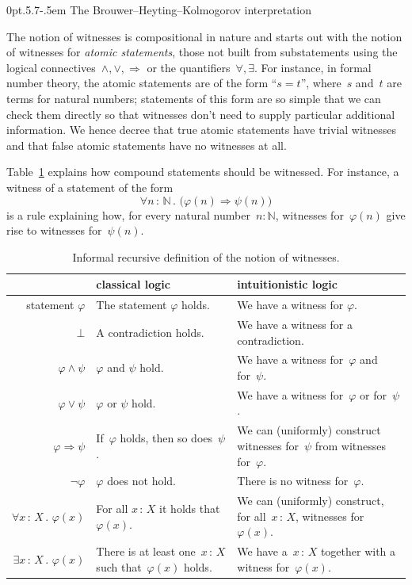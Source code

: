 \documentclass[10pt,reqno,a4paper,openany]{amsbook}
\makeatletter
\theoremstyle{definition}
\theoremstyle{plain}
\theoremstyle{remark}
\newcommand{\NN}{\mathbb{N}}
\newcommand{\?}{\,{:}\,}
\renewcommand{\_}{\mathpunct{.}\,}
\def\subsection{\@startsection{subsection}{2}%
  {0pt}{.5\linespacing\@plus.7\linespacing}{-.5em}%
  {\normalfont\bfseries}}
\makeatother
\begin{document}
\subsection{The Brouwer--Heyting--Kolmogorov interpretation}

The notion of witnesses is compositional in nature and starts out with the notion of witnesses for \emph{atomic
statements}, those not built from substatements using the logical
connectives~$\wedge,\vee,\Rightarrow$ or the quantifiers~$\forall,\exists$. For
instance, in formal number theory, the atomic statements are of the form
``$s = t$'',
where~$s$ and~$t$ are terms for natural numbers; statements of this form are so
simple that we can check them directly so that witnesses don't need to supply
particular additional information. We hence decree that true atomic statements
have trivial witnesses and that false atomic statements have no witnesses at
all.

Table~\ref{table:bhk} explains how compound statements should be witnessed. For
instance, a witness of a statement of the form
\[ \forall n \? \NN\_ \bigl(\varphi(n) \Rightarrow \psi(n)\bigr) \]
is a rule explaining how, for every natural number~$n : \NN$, witnesses
for~$\varphi(n)$ give rise to witnesses for~$\psi(n)$.

\begin{table}
  \centering
  \small
  \renewcommand{\arraystretch}{1.3}
  \begin{tabular}{@{}rp{4.3cm}p{5.3cm}@{}}
    \toprule
    & {classical logic} & {intuitionistic logic}
    \\\midrule
    statement $\varphi$ & The statement $\varphi$ holds. & We have a witness for $\varphi$. \\
    $\bot$ & A contradiction holds. & We have a witness for a contradiction. \\
    $\varphi \wedge \psi$ & $\varphi$ and $\psi$ hold. & We have a witness for~$\varphi$ and for~$\psi$. \\
    $\varphi \vee \psi$ & $\varphi$ or $\psi$ hold. & We have a witness for~$\varphi$ or for~$\psi$. \\
    $\varphi \Rightarrow \psi$ & If~$\varphi$ holds, then so does~$\psi$. &
    We can (uniformly) construct witnesses for~$\psi$ from witnesses
    for~$\varphi$. \\
    $\neg\varphi$ &
      $\varphi$ does not hold. &
      There is no witness for~$\varphi$. \\
    $\forall x\?X\_ \varphi(x)$ & For all $x \? X$ it holds that~$\varphi(x).$ &
      We can (uniformly) construct, for all~$x \? X$, witnesses for~$\varphi(x)$. \\
    $\exists x\?X\_ \varphi(x)$ & \raggedright There is at least one~$x \? X$
    such that~$\varphi(x)$ holds. & {\raggedright
      We have a~$x \? X$ together with a witness for~$\varphi(x)$.} \\
    \bottomrule
  \end{tabular}
  \caption{\label{table:bhk}Informal recursive definition of the notion of witnesses.}
\end{table}
\end{document}

